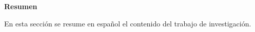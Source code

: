 \thispagestyle{plain}
\begin{center}
	\Large    
	\vspace{0.9cm}
	\textbf{Resumen}
\end{center}
En esta sección se resume en español el contenido del trabajo de investigación.